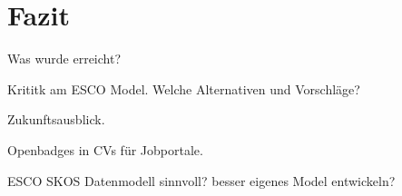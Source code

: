\section{Fazit}\label{fazit}

Was wurde erreicht?

Krititk am ESCO Model. Welche Alternativen und Vorschläge?

Zukunftsausblick.

Openbadges in CVs für Jobportale.

ESCO SKOS Datenmodell sinnvoll? besser eigenes Model entwickeln?